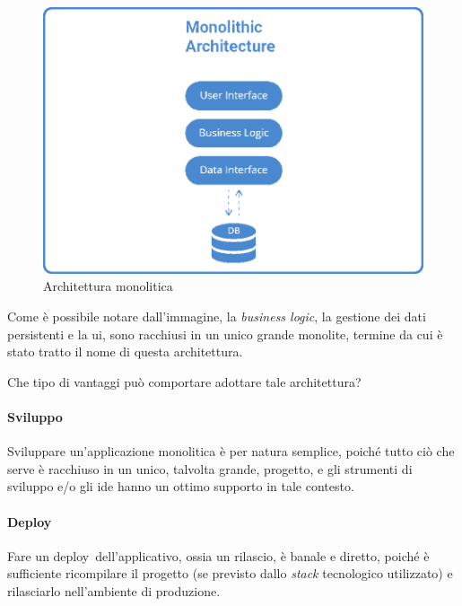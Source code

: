\begin{figure}[H]
	\centering
	\includegraphics[width=\textwidth]{immagini/monolithic_architectureB.png} %
	\caption[Architettura monolitica]{Architettura monolitica}%
	\label{fig:monolithic-arch}
\end{figure}

Come è possibile notare dall'immagine, la \textit{business logic}, la gestione dei dati persistenti e la \gls{ui}, sono racchiusi in un unico grande monolite, termine da cui è stato tratto il nome di questa architettura.

Che tipo di vantaggi può comportare adottare tale architettura?


\paragraph*{Sviluppo} Sviluppare un'applicazione monolitica è per natura semplice, poiché tutto ciò che serve è racchiuso in un unico, talvolta grande, progetto, e gli strumenti di sviluppo e/o gli \gls{ide} 
hanno un ottimo supporto in tale contesto.

\paragraph*{Deploy} Fare un \gls{deploy}\gloss\ dell'applicativo, ossia un rilascio, è banale e diretto, poiché è sufficiente ricompilare il progetto (se previsto dallo \textit{stack} tecnologico utilizzato) e rilasciarlo nell'ambiente di produzione.

